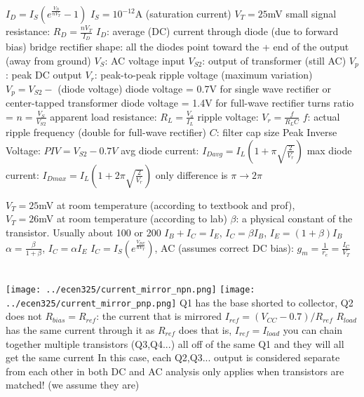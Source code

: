 \documentclass[12pt]{article}
\begin{document}
\begin{spacing}{0.8}
\begin{multicols*}{2}
\begin{flushleft}
\begin{outline}[longenum]
  \1 $I_D = I_S \left( e^{\frac{V_D}{n V_T}} - 1 \right)$
    \2 $I_S=10^{-12}$A (saturation current)
    \2 $V_T=25$mV
  \1 small signal resistance: $R_D = \frac{nV_T}{I_D}$
    \2 $I_D$: average (DC) current through diode (due to forward bias)
  \1 bridge rectifier shape: all the diodes point toward the + end of the output (away from ground)
  \1 $V_S$: AC voltage input
  \1 $V_{S2}$: output of transformer (still AC)
  \1 $V_p$: peak DC output
  \2 $V_r$: peak-to-peak ripple voltage (maximum variation)
  \1 $V_p=V_{S2}-$ (diode voltage)
    \2 diode voltage = 0.7V for single wave rectifier or center-tapped transformer
    \2 diode voltage = 1.4V for full-wave rectifier
  \1 turns ratio = $n=\frac{V_S}{V_{S2}}$
  \1 apparent load resistance: $R_L = \frac{V_o}{I_L}$
  \1 ripple voltage: $V_r=\frac{f}{R_L C}$
    \2 $f$: actual ripple frequency (double for full-wave rectifier)
    \2 $C$: filter cap size
  \1 Peak Inverse Voltage: $ PIV = V_{S2}-0.7V$
  \1 avg diode current: $I_{Davg}=I_L \left( 1+\pi\sqrt{\frac{2}{V_r}} \right)$
  \1 max diode current: $I_{Dmax}=I_L \left( 1+2\pi\sqrt{\frac{2}{V_r}} \right)$
    \2 only difference is $\pi \rightarrow 2\pi$

  \1 $V_T = 25$mV at room temperature (according to textbook and prof),
  \\ $V_T = 26$mV at room temperature (according to lab)
  \1 $\beta$: a physical constant of the transistor. Usually about 100 or 200
  \1 
    $I_B + I_C = I_E$, 
    $I_C = \beta I_B$,
    $I_E = (1+\beta) I_B$
  \1
    $\alpha = \frac{\beta}{1+\beta}$,
    $I_C = \alpha I_E$
  \1
    $I_C = I_S ( e^{\frac{V_{BE}}{n V_T}} )$,
  \1 AC (assumes correct DC bias):
    $g_m = \frac{1}{r_e} = \frac{I_C}{V_T}$

\\
\texttt{[image: ../ecen325/current\_mirror\_npn.png]}
\texttt{[image: ../ecen325/current\_mirror\_pnp.png]}
  \1 Q1 has the base shorted to collector, Q2 does not
  \1 $R_{bias}=R_{ref}$: the current that is mirrored
  \1 $I_{ref}=(V_{CC}-0.7)/R_{ref}$
  \1 $R_{load}$ has the same current through it as $R_{ref}$ does
    \2 that is, $I_{ref} = I_{load}$
  \1 you can chain together multiple transistors (Q3,Q4...) all off of
    the same Q1 and they will all get the same current
    \2 In this case, each Q2,Q3... output is considered separate from each other
      in both DC and AC analysis
  \1 only applies when transistors are matched! (we assume they are)


\end{outline}
\end{flushleft}
\end{multicols*}
\end{spacing}
\end{document}
